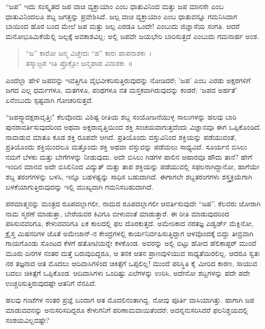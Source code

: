 {“ಜಪ” ಇದು ಸಂಸ್ಕೃತದ ಜಪ ವಾಚಿ ವ್ಯಕ್ತಾಯಾಂ ಎಂಬ ಧಾತುವಿನಿಂದ ಮತ್ತು ಜಪ ಮಾನಸೇ ಎಂಬ ಧಾತುವಿನಿಂದಲೂ ಶಬ್ದ ಜಗತ್ತನ್ನು ಪ್ರವೇಶಿಸಿದೆ. ಜಲ್ಪ ವಾಚಿ \-ವ್ಯಕ್ತಾಯಾಂ ಎಂಬ ಧಾತುವನ್ನೂ ಗಮನಿಸಿದಾಗ ಬಾಯಿಂದ ಹೊರ ಬಂದ ಮೇಲೆ ಜಪ ಮತ್ತು ಜಲ್ಪ ಎರಡೂ ಒಂದೇ! ಎಂಬುದು ಜಿಜ್ಞಾಸೆಯ ಸಂಗತಿ. ಆದರೆ ಮನೋ\-ಭೂಮಿಕೆಯೆಲ್ಲಿ ಜಲ್ಪಕ್ಕೆ ಅವಕಾಶವಿಲ್ಲ; ಅಲ್ಲಿ ಜಪವೇ ಜಯಭೇರಿ ಬಾರಿಸುತ್ತದೆ ಎಂಬುದು ಗಮನಾರ್ಹ ಅಂಶ.
\begin{verse}
“ಜ” ಕಾರೋ ಜನ್ಮ ವಿಚ್ಚೇದಃ “ಪ” ಕಾರಃ ಪಾಪನಾಶಕಃ~। \\
ತಸ್ಮಾಜ್ಜಪ ಇತಿ ಪ್ರೊಕ್ತೋ ಜನ್ಮಪಾಪ ವಿನಾಶಕಃ~॥
\end{verse}
ಎಂದೆಲ್ಲಾ ಹೇಳಿ ಜಪವನ್ನು ಇವತ್ತಿಗೂ ವೈಭವೀಕರಿಸುತ್ತಿರುವುದನ್ನು ನೋಡಿದರೆ; ’ಜಪ’ ಎಂಬ ಎರಡು ಅಕ್ಷರಗಳಿಗೆ ಜಗದ ಎಲ್ಲ ಧರ್ಮಗಳೂ, ಮತಗಳೂ, ಪಂಥಗಳೂ ನತ ಮಸ್ತಕವಾಗಿರುವುದನ್ನು ಕಂಡರೆ; ‘ಜಪದ ಅರ್ಹತೆ’ ಏನೆಂಬುದು ಸ್ಪಷ್ಟವಾಗಿ ಗೋಚರಿಸುತ್ತದೆ.

“ಜಪಸ್ಸ್ಯಾದಕ್ಷರಾವೃತ್ತಿಃ" ಕೆಲವೊಂದು ವಿಶಿಷ್ಟ ರೀತಿಯ ಶಬ್ದ ಸಂಯೋಜನೆಯುಳ್ಳ ಸಾಲುಗಳನ್ನು ಹಲವು ಬಾರಿ ಪುನರಾವರ್ತಿಸುವುದರಿಂದ ಅಥವಾ ಅಕ್ಷರಾವೃತ್ತಿಯಿಂದ ಶಕ್ತಿ ಸಂಚಯವಾಗುತ್ತದೆಂದು ವಿಜ್ಞಾನವೂ ಈಗ ಒಪ್ಪಿಕೊಂಡಿದೆ. ನಾವಾಡುವ ಮಾತೂ ಕೂಡ ಶಕ್ತಿ ರೂಪವೇ ಆಗಿದೆ. ಪ್ರತಿಯೊಂದು ವಸ್ತುವಿನಿಂದ ಶಕ್ತಿಯನ್ನು ಪಡೆಯುವಂತೆ, ಪ್ರತಿಯೊಂದು ಶಕ್ತಿಯಿಂದಲೂ ಮತ್ತೊಂದು ಶಕ್ತಿ ಅಥವಾ ವಸ್ತುವನ್ನು ಪಡೆಯಲು ಸಾಧ್ಯವಿದೆ. ಸೂರ್ಯನ ಬಿಸಿಲು ನಮಗೆ ಬೆಳಕು ಮತ್ತು ಬೇಗೆಗಳನ್ನು ನೀಡುವುದು. ಅದೇ ಬಿಸಿಲು ಗಿಡಗಳ ಪಾಲಿನ ಆಹಾರವೂ ಹೌದು ತಾನೆ? ಹೇಗೆ ಇಂದಿನ ಮಾನವ ಅದೇ ಬಿಸಿಲಿನಿಂದ ವಿದ್ಯುತ್ ಮತ್ತು ತಾಪ ಶಕ್ತಿಯನ್ನು ಪಡೆಯುವಲ್ಲಿ ಸಫಲನಾಗಿದ್ದಾನೋ, ಹಾಗೆಯೇ ಶಬ್ದ ತರಂಗಗಳನ್ನು ಬಳಸಿ, ಇನ್ನೂ ಬಹಳಷ್ಟನ್ನು ಸಾಧಿಸ ಬಹುದಾಗಿದೆ. ಈಗಾಗಲೇ ಶಬ್ದತರಂಗಗಳು ಶಸ್ತ್ರಕ್ರಿಯೆಗಾಗಿ ಬಳಕೆಯಾಗುತ್ತಿರುವುದನ್ನು ಇಲ್ಲಿ ಮುಖ್ಯವಾಗಿ ಗಮನಿಸಬಹುದಾಗಿದೆ.

ಪರಮಾತ್ಮನನ್ನು ಮಂತ್ರದ ರೂಪದಲ್ಲಾಗಲೀ, ನಾಮದ ರೂಪದಲ್ಲಾಗಲೀ ಆವರ್ತಿ\-ಸುವುದೇ “ಜಪ”. ಕೆಲವರು ಜೋರಾಗಿ ನಾಮ ಸ್ಮರಣೆ ಮಾಡುತ್ತಾ, ಬೇರೆಯವರ ಕಿವಿಗೂ ಬೀಳುವಂತೆ ಮಾಡುತ್ತಾರೆ. ಈ ರೀತಿ ಮಾಡುವುದರಿಂದ ಪಠಿಸುವವರಿಗೂ, ಕೇಳುವವರಿಗೂ ಏಕ ಕಾಲದಲ್ಲಿ ಫಲ ದೊರಕುತ್ತದೆ. ಅಮೇರಿಕಾದ ನರತಜ್ಞ ಎಡ್ವರ್ಡ್ ಮೆಕ್ಲಿನೋ, ಕ್ರೈಸ್ತ ಮಿಷನರಿಗಳ ಜೊತೆ ಅಮೇಜಾನ್-ನ ಕೇಂದ್ರಗಳಲ್ಲಿ ಕಾರ್ಯನಿರ್ವ\-ಹಿಸುತ್ತಿದ್ದಾಗ ಆಳವೊಂದಕ್ಕೆ ಬಿದ್ದು ತೀವ್ರವಾಗಿ ಗಾಯಗೊಂಡು ಸೊಂಟದ ಕೆಳಗೆ ಹತೋಟಿ\-ಯನ್ನೇ ಕಳಕೊಂಡ. ಅವರನ್ನು ಅಲ್ಲಿ ಬಿಟ್ಟು ಹೋದ ಹೆಲಿಕಾಪ್ಟರ್ ಮುಂದೆ ಮೂರು ದಿನಗಳ ನಂತರ ಮತ್ತೆ ಬರುವುದಿದ್ದರೂ, ಆ ತನಕ ಆತನ ಪ್ರಾಣವುಳಿಯುವ ಸಾಧ್ಯತೆಯಿರಲಿಲ್ಲ. ಆದರೂ ಸ್ವತಃ ನರ ತಜ್ಞನಾದ ಆತ ಮೊದಲು ಆದಿವಾಸಿಗಳಿಂದ ಚಿಕಿತ್ಸೆಗೆ ಒಪ್ಪಲಿಲ್ಲ! ಮುಂದೆ ಪರಿಸ್ಥಿತಿ ಕೈ ಮೀರಿದ ಕಾರಣ, ಸಾಯುವ ಬದಲು ಚಿಕಿತ್ಸೆಗೆ ಒಪ್ಪಿಕೊಂಡ. ಆದಿವಾಸಿಗಳು ಒಂದಿಷ್ಟು ಎಲೆಗಳನ್ನು ಉರಿಸಿ, ಅದೇನೋ ಶಬ್ದಗಳನ್ನು ಪದೇ ಪದೇ ಉಚ್ಚರಿಸುತ್ತಿರುವುದಷ್ಟೇ ಆತನಿಗೆ ನೆನಪಿದೆ. 

ಹಲವು ಗಂಟೆಗಳ ನಂತರ ಪ್ರಜ್ಞೆ ಬಂದಾಗ ಆತ ಮೊದಲಿನಂತಾಗಿದ್ದ. ನೋವು ಪೂರ್ತಿ ವಾಸಿಯಾಗಿತ್ತು. ಹಾಗಾಗಿ ಜಪ ಮಾಡುವವನನ್ನು ಅನುಸರಿಸದಿದ್ದರೂ ಕೇಳುಗನಿಗೆ ಪರಿಣಾಮವಾಯಿತೆಂದರೆ; ಅದನ್ನನುಸರಿಸಿದರೆ ಫಲನಿಶ್ಚಯದಲ್ಲಿ ಸಂಶಯವಿಲ್ಲವಷ್ಟೇ?

}
